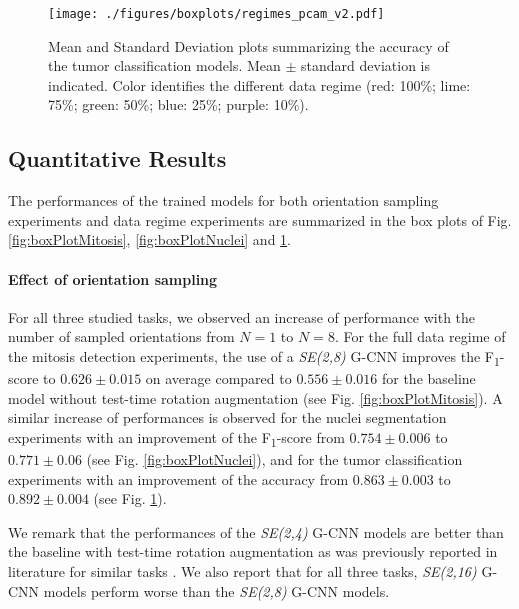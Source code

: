 \documentclass[twocolumn,final]{article}
\newcommand{\fscore}[1]{F\textsubscript{#1}-score}
\newcommand{\se}[1]{\textit{SE(#1)}}
\begin{document}
\begin{figure}[ht!]
\begin{center}
\texttt{[image: ./figures/boxplots/regimes\_pcam\_v2.pdf]}
\caption{
\footnotesize
Mean and Standard Deviation plots summarizing the accuracy of the tumor classification models.
Mean $\pm$ standard deviation  is indicated.
Color identifies the different data regime (red: 100\%; lime: 75\%; green: 50\%; blue: 25\%; purple: 10\%).}
\label{fig:boxPlotTumor}
\end{center}
\end{figure}

\subsection{Quantitative Results}
\label{quantitativeResults}
The performances of the trained models for both orientation sampling experiments and data regime experiments are summarized in the box plots of Fig. \ref{fig:boxPlotMitosis}, \ref{fig:boxPlotNuclei} and \ref{fig:boxPlotTumor}.

\paragraph{Effect of orientation sampling} 
For all three studied tasks, we observed an increase of performance with the number of sampled orientations from $N=1$ to $N=8$.
For the full data regime of the mitosis detection experiments, the use of a \se{2,8} G-CNN improves the \fscore{1} to $0.626{\pm}0.015$ on average compared to $0.556{\pm}0.016$ for the baseline model without test-time rotation augmentation (see Fig. \ref{fig:boxPlotMitosis}).
A similar increase of performances is observed for the nuclei segmentation experiments with an improvement of the \fscore{1} from $0.754{\pm}0.006$ to $0.771{\pm}0.06$ (see Fig. \ref{fig:boxPlotNuclei}), and for the tumor classification experiments with an improvement of the accuracy from $0.863{\pm}0.003$ to $0.892{\pm}0.004$ (see Fig. \ref{fig:boxPlotTumor}).

We remark that the performances of the \se{2,4} G-CNN models are better than the baseline with test-time rotation augmentation as was previously reported in literature for similar tasks \citep{bekkers2018roto, veeling2018rotation}. We also report that for all three tasks, \se{2,16} G-CNN models perform worse than the \se{2,8} G-CNN models.
\end{document}
